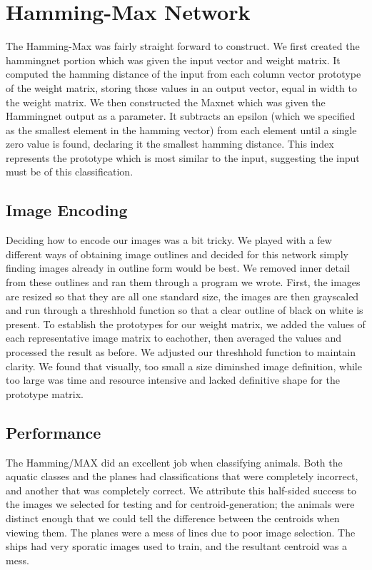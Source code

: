 \documentclass{article}
\begin{document}
\section{Hamming-Max Network}
The Hamming-Max was fairly straight forward to construct.  We first created the hammingnet portion which was given the input vector and weight matrix.  It computed the hamming distance of the input from each column vector prototype of the weight matrix, storing those values in an output vector, equal in width to the weight matrix.  We then constructed the Maxnet which was given the Hammingnet output as a parameter.  It subtracts an epsilon (which we specified as the smallest element in the hamming vector) from each element until a single zero value is found, declaring it the smallest hamming distance.  This index represents the prototype which is most similar to the input, suggesting the input must be of this classification.

\subsection{Image Encoding}
Deciding how to encode our images was a bit tricky.  We played with a few different ways of obtaining image outlines and decided for this network simply finding images already in outline form would be best.  We removed inner detail from these outlines and ran them through a program we wrote.  First, the images are resized so that they are all one standard size,  the images are then grayscaled and run through a threshhold function so that a clear outline of black on white is present.  To establish the prototypes for our weight matrix, we added the values of each representative image matrix to eachother, then averaged the values and processed the result as before.  We adjusted our threshhold function to maintain clarity.  We found that visually, too small a size diminshed image definition, while too large was time and resource intensive and lacked definitive shape for the prototype matrix.

\subsection{Performance}
The Hamming/MAX did an excellent job when classifying animals. Both the aquatic classes and the planes had classifications that were completely incorrect, and another that was completely correct. We attribute this half-sided success to the images we selected for testing and for centroid-generation; the animals were distinct enough that we could tell the difference between the centroids when viewing them. The planes were a mess of lines due to poor image selection. The ships had very sporatic images used to train, and the resultant centroid was a mess. 
\end{document}
